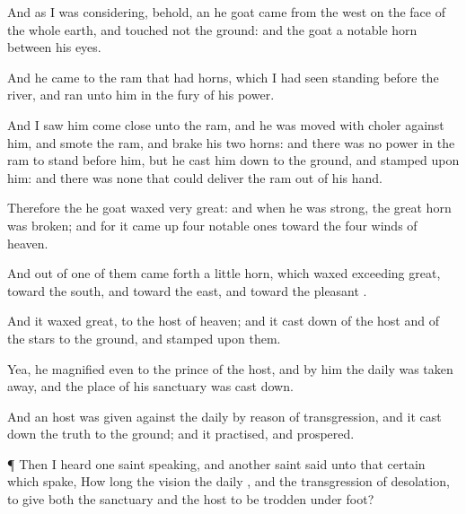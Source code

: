 {And as I was
considering, behold, an
he
goat
came from the
west on the
face of the whole
earth, and
touched not the
ground: and the
goat
{} a
notable
horn between his
eyes.

And he
came to the
ram that
had
{}
horns, which I had
seen
standing
before the
river, and
ran unto him in the
fury of his
power.

And I
saw him
come close
unto the
ram, and he was moved with
choler against him, and
smote the
ram, and
brake his
two
horns: and there was no
power in the
ram to
stand
before him, but he cast him
down to the
ground, and
stamped upon him: and there was none that could
deliver the
ram out of his
hand.

Therefore the
he
goat waxed
very
great: and when he was
strong, the
great
horn was
broken; and for it came
up
four notable
ones toward the
four
winds of
heaven.

And out of
one of them came
forth a
little
horn, which waxed
exceeding
great, toward the
south, and toward the
east, and toward the
pleasant
{}.

And it waxed
great,
{} to the
host of
heaven; and it cast
down
{} of the
host and of the
stars to the
ground, and
stamped upon them.

Yea, he
magnified
{} even to the
prince of the
host, and by him the
daily
{} was taken
away, and the
place of his
sanctuary was cast
down.

And an
host was
given
{} against the
daily
{} by reason of
transgression, and it cast
down the
truth to the
ground; and it
practised, and
prospered.


\par }{\PP {}¶ Then I
heard
one
saint
speaking, and
another
saint
said unto that
certain
{} which
spake, How long
{} the
vision
{} the
daily
{}, and the
transgression of
desolation, to
give both the
sanctuary and the
host to be trodden under
foot?

}
